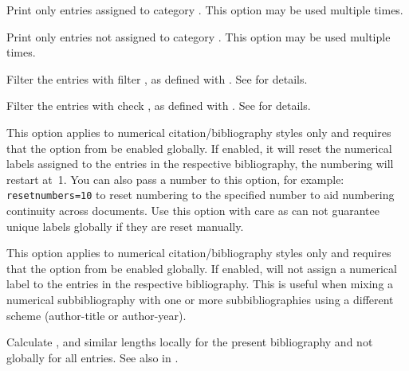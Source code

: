 \documentclass{ltxdockit}[2011/03/25]
\newcommand*{\biblatex}{\sty{biblatex}\xspace}
\begin{document}
\begin{optionlist*}

Print only entries assigned to category . This option may be used multiple times.


Print only entries not assigned to category . This option may be used multiple times.


Filter the entries with filter , as defined with . See  for details.


Filter the entries with check , as defined with . See  for details.


This option applies to numerical citation\slash bibliography styles only and requires that the  option from  be enabled globally. If enabled, it will reset the numerical labels assigned to the entries in the respective bibliography, \ie the numbering will restart at~1. You can also pass a number to this option, for example: \texttt{resetnumbers=10} to reset numbering to the specified number to aid numbering continuity across documents. Use this option with care as \biblatex can not guarantee unique labels globally if they are reset manually.


This option applies to numerical citation\slash bibliography styles only and requires that the  option from  be enabled globally. If enabled, \biblatex will not assign a numerical label to the entries in the respective bibliography. This is useful when mixing a numerical subbibliography with one or more subbibliographies using a different scheme (\eg author-title or author-year).


Calculate ,  and similar lengths locally for the present bibliography and not globally for all entries. See also  in .

\end{optionlist*}
\end{document}

